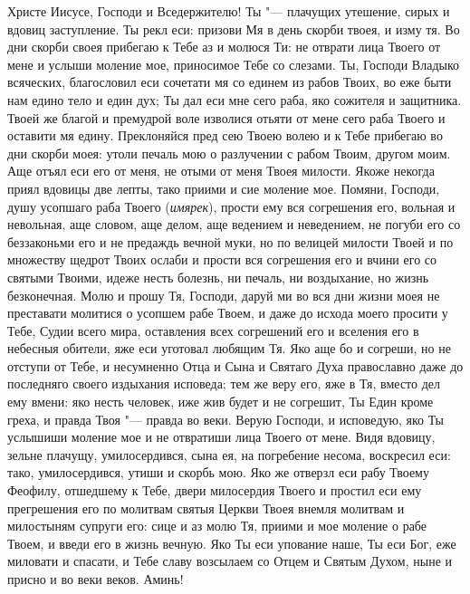 \begin{mymulticols}
 


Христе Иисусе, Господи и Вседержителю! Ты "--- плачущих утешение, сирых и вдовиц заступление. Ты рекл еси: призови Мя в день скорби твоея, и изму тя. Во дни скорби своея прибегаю к Тебе аз и молюся Ти: не отврати лица Твоего от мене и услыши моление мое, приносимое Тебе со слезами. Ты, Господи Владыко всяческих, благословил еси сочетати мя со единем из рабов Твоих, во еже быти нам едино тело и един дух; Ты дал еси мне сего раба, яко сожителя и защитника. Твоей же благой и премудрой воле изволися отьяти от мене сего раба Твоего и оставити мя едину. Преклоняйся пред сею Твоею волею и к Тебе прибегаю во дни скорби моея: утоли печаль мою о разлучении с рабом Твоим, другом моим. Аще отъял еси его от меня, не отыми от меня Твоея милости. Якоже некогда приял вдовицы две лепты, тако приими и сие моление мое. Помяни, Господи, душу усопшаго раба Твоего ({\itshape имярек}), прости ему вся согрешения его, вольная и невольная, аще словом, аще делом, аще ведением и неведением, не погуби его со беззаконьми его и не предаждь вечной муки, но по велицей милости Твоей и по множеству щедрот Твоих ослаби и прости вся согрешения его и вчини его со святыми Твоими, идеже несть болезнь, ни печаль, ни воздыхание, но жизнь безконечная. Молю и прошу Тя, Господи, даруй ми во вся дни жизни моея не преставати молитися о усопшем рабе Твоем, и даже до исхода моего просити у Тебе, Судии всего мира, оставления всех согрешений его и вселения его в небесныя обители, яже еси уготовал любящим Тя. Яко аще бо и согреши, но не отступи от Тебе, и несумненно Отца и Сына и Святаго Духа православно даже до последняго своего издыхания исповеда; тем же веру его, яже в Тя, вместо дел ему вмени: яко несть человек, иже жив будет и не согрешит, Ты Един кроме греха, и правда Твоя "--- правда во веки. Верую Господи, и исповедую, яко Ты услышиши моление мое и не отвратиши лица Твоего от мене. Видя вдовицу, зельне плачущу, умилосердився, сына ея, на погребение несома, воскресил еси: тако, умилосердився, утиши и скорбь мою. Яко же отверзл еси рабу Твоему Феофилу, отшедшему к Тебе, двери милосердия Твоего и простил еси ему прегрешения его по молитвам святыя Церкви Твоея внемля молитвам и милостыням супруги его: сице и аз молю Тя, приими и мое моление о рабе Твоем, и введи его в жизнь вечную. Яко Ты еси упование наше, Ты еси Бог, еже миловати и спасати, и Тебе славу возсылаем со Отцем и Святым Духом, ныне и присно и во веки веков. Аминь!

\end{mymulticols}

